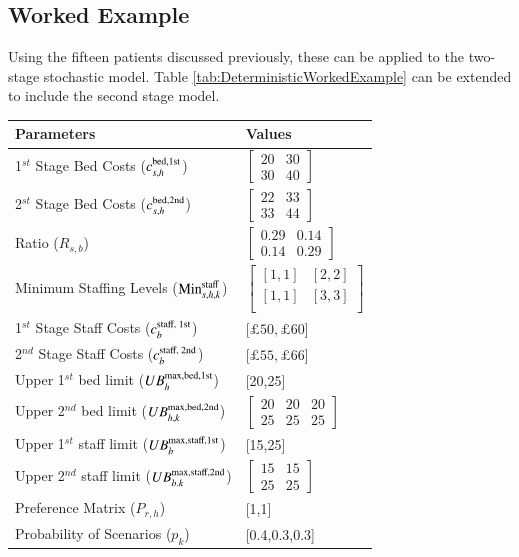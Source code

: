 \documentclass[../thesis.tex]{subfiles}
\begin{document}
{\subsection{Worked Example}

Using the fifteen patients discussed previously, these can be applied to the two-stage stochastic model. Table \ref{tab:DeterministicWorkedExample} can be extended to include the second stage model.


\begin{table}[h!]
    \centering
    \begin{tabular}{ll}\toprule
       \textbf{Parameters}  & \textbf{Values} \\\midrule
        1$^{st}$ Stage Bed Costs ($c^\textnormal{bed,1st}_{s,h}$) & $\begin{bmatrix} 20 & 30 \\ 30 & 40 \end{bmatrix}$\\  [0.5cm]
        2$^{st}$ Stage Bed Costs ($c^\textnormal{bed,2nd}_{s,h}$) & $\begin{bmatrix} 22 & 33 \\ 33 & 44 \end{bmatrix}$\\ [0.5cm]
        Ratio ($R_{s,b}$) &$\begin{bmatrix}0.29&0.14\\
         0.14&0.29\end{bmatrix}$\\ [0.5cm]
         Minimum Staffing Levels ($\textnormal{Min}^\textnormal{staff}_{s,h,k}$) &$\begin{bmatrix}
         [1,1]&[2,2]  \\
         [1,1]&[3,3]\\
         \end{bmatrix}$\\[0.5cm]
         1$^{st}$ Stage Staff Costs ($c^\textnormal{staff, 1st}_{b}$) &[$\pounds50, \pounds60$] \\ [0.25cm]
         2$^{nd}$ Stage Staff Costs ($c^\textnormal{staff, 2nd}_{b}$) &[$\pounds55, \pounds66$] \\ [0.25cm]
         Upper 1$^{st}$ bed limit ($UB^\textnormal{max,bed,1st}_{h}$) &  [20,25]\\[0.25cm]
         Upper 2$^{nd}$ bed limit ($UB^\textnormal{max,bed,2nd}_{h,k}$) &  $\begin{bmatrix} 20 & 20 &20\\ 25 & 25 &25 \end{bmatrix}$\\[0.5cm]
         Upper 1$^{st}$ staff limit ($UB^\textnormal{max,staff,1st}_{b}$)& [15,25]\\[0.25cm]
         Upper 2$^{nd}$ staff limit ($UB^\textnormal{max,staff,2nd}_{b.k}$)& $\begin{bmatrix} 15 & 15 \\ 25 & 25 \end{bmatrix}$\\[0.5cm]
         Preference Matrix ($P_{r,h}$) & [1,1]\\[0.25cm]
         Probability of Scenarios ($p_{k}$) & [0.4,0.3,0.3]\\
         

\end{tabular}
\end{table}}
\end{document}
